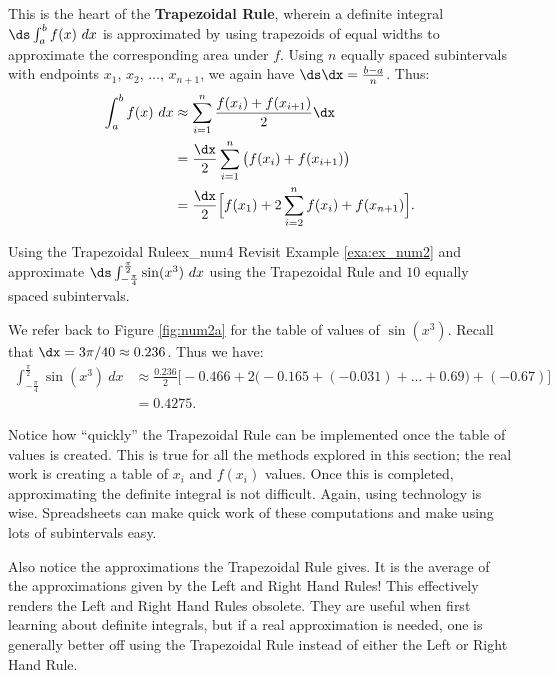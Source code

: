 This is the heart of the \textbf{Trapezoidal Rule}, wherein a definite integral $\ds \int_a^b f(x) \ dx$ is approximated by using trapezoids of equal widths to approximate the corresponding area under $f$. Using $n$ equally spaced subintervals with endpoints $x_1$, $x_2$, $\ldots$, $x_{n+1}$, we again have $\ds \dx = \frac{b-a}n$. Thus:
\begin{align*}
\int_a^b f(x)\ dx & \approx \sum_{i=1}^n \frac{f(x_i)+f(x_{i+1})}2\dx \\
									& = \frac{\dx}2 \sum_{i=1}^n \big(f(x_i)+f(x_{i+1})\big)\\
									& = \frac{\dx}2\Big[f(x_1)+ 2\sum_{i=2}^n f(x_i) + f(x_{n+1})\Big].\\ 
\end{align*}


\begin{example}{Using the Trapezoidal Rule}{ex_num4}{
Revisit Example \ref{exa:ex_num2} 
and approximate $\ds\int_{-\frac{\pi}{4}}^{\frac{\pi}{2}} \sin (x^3)\ dx$ using the Trapezoidal Rule and $ 10 $ equally spaced subintervals.}
\end{example}

\begin{solution}
{We refer back to Figure \ref{fig:num2a} for the table of values of $\sin(x^3)$. Recall that $\dx = 3\pi/40 \approx 0.236$. Thus we have:\small
\begin{align*}
\int_{-\frac{\pi}4}^{\frac{\pi}2} \sin (x^3)\ dx &\approx \frac{0.236}{2}\Big[-0.466 + 2\Big(-0.165+(-0.031)+\ldots+%
0.69\Big)+(-0.67)\Big]\\
			&= 0.4275.
\end{align*}
}
\end{solution}





Notice how ``quickly'' the Trapezoidal Rule can be implemented once the table of values is created. This is true for all the methods explored in this section; the real work is creating a table of $x_i$ and $f(x_i)$ values. Once this is completed, approximating the definite integral is not difficult. Again, using technology is wise. Spreadsheets can make quick work of these computations and make using lots of subintervals easy. 

Also notice the  approximations the Trapezoidal Rule gives. It is  the average of the approximations given by the Left and Right Hand Rules! This effectively renders the Left and Right Hand Rules obsolete. They are useful when first learning about definite integrals, but if a real approximation is needed, one is generally better off using the Trapezoidal Rule instead of either the Left or Right Hand Rule.\\

